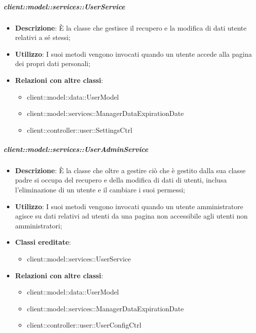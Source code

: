 \begin{itemize}
		\subparagraph{client::model::services::UserService} %
		\label{subp:client_model_services_userservice}
			\begin{itemize}
				\item \textbf{Descrizione}: È la classe che gestisce il recupero e la modifica di dati utente relativi a sé stessi;
				\item \textbf{Utilizzo}: I suoi metodi vengono invocati quando un utente accede alla pagina dei propri dati personali;
				\item \textbf{Relazioni con altre classi}:
					\begin{itemize}
						\item client::model::data::UserModel
						\item client::model::services::ManagerDataExpirationDate
						\item client::controller::user::SettingsCtrl
					\end{itemize}
			\end{itemize}

		\subparagraph{client::model::services::UserAdminService} %
		\label{subp:client_model_services_useradminservice}
			\begin{itemize}
				\item \textbf{Descrizione}: È la classe che oltre a gestire ciò che è gestito dalla sua classe padre si occupa del recupero e della modifica di dati di utenti, inclusa l'eliminazione di un utente e il cambiare i suoi permessi;
				\item \textbf{Utilizzo}: I suoi metodi vengono invocati quando un utente amministratore agisce su dati relativi ad utenti da una pagina non accessibile agli utenti non amministratori;
				\item \textbf{Classi ereditate}:					
					\begin{itemize}
						\item client::model::services::UserService
					\end{itemize}
				\item \textbf{Relazioni con altre classi}:
					\begin{itemize}
						\item client::model::data::UserModel
						\item client::model::services::ManagerDataExpirationDate
						\item client::controller::user::UserConfigCtrl
					\end{itemize}
				\end{itemize}


\end{itemize}
